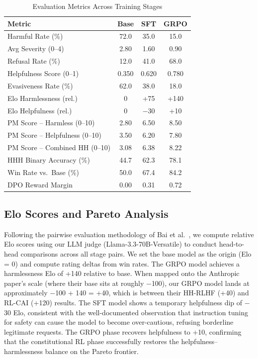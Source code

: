 \documentclass[conference]{IEEEtran}
\begin{document}
\begin{table}[htbp]
\caption{Evaluation Metrics Across Training Stages}
\begin{center}
\begin{tabular}{|l|c|c|c|}
\hline
\textbf{Metric} & \textbf{Base} & \textbf{SFT} & \textbf{GRPO} \\
\hline
Harmful Rate (\%) & 72.0 & 35.0 & 15.0 \\
Avg Severity (0--4) & 2.80 & 1.60 & 0.90 \\
Refusal Rate (\%) & 12.0 & 41.0 & 68.0 \\
Helpfulness Score (0--1) & 0.350 & 0.620 & 0.780 \\
Evasiveness Rate (\%) & 62.0 & 38.0 & 18.0 \\
Elo Harmlessness (rel.) & 0 & +75 & +140 \\
Elo Helpfulness (rel.) & 0 & $-$30 & +10 \\
PM Score -- Harmless (0--10) & 2.80 & 6.50 & 8.50 \\
PM Score -- Helpfulness (0--10) & 3.50 & 6.20 & 7.80 \\
PM Score -- Combined HH (0--10) & 3.08 & 6.38 & 8.22 \\
HHH Binary Accuracy (\%) & 44.7 & 62.3 & 78.1 \\
Win Rate vs.~Base (\%) & 50.0 & 67.4 & 84.2 \\
DPO Reward Margin & 0.00 & 0.31 & 0.72 \\
\hline
\end{tabular}
\label{tab:results_main}
\end{center}
\end{table}

\subsection{Elo Scores and Pareto Analysis}

Following the pairwise evaluation methodology of Bai et al.~\cite{bai2022constitutional}, we compute relative Elo scores using our LLM judge (Llama-3.3-70B-Versatile) to conduct head-to-head comparisons across all stage pairs. We set the base model as the origin (Elo = 0) and compute rating deltas from win rates. The GRPO model achieves a harmlessness Elo of +140 relative to base. When mapped onto the Anthropic paper's scale (where their base sits at roughly $-$100), our GRPO model lands at approximately $-$100 + 140 = +40, which is between their HH-RLHF (+40) and RL-CAI (+120) results. The SFT model shows a temporary helpfulness dip of $-$30 Elo, consistent with the well-documented observation that instruction tuning for safety can cause the model to become over-cautious, refusing borderline legitimate requests. The GRPO phase recovers helpfulness to +10, confirming that the constitutional RL phase successfully restores the helpfulness--harmlessness balance on the Pareto frontier.
\end{document}
